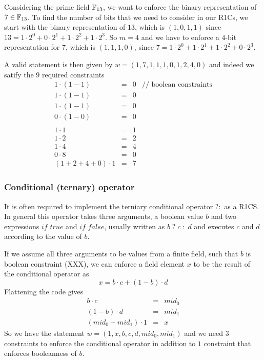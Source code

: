 \begin{example} Considering the prime field $\mathbb{F}_{13}$, we want to enforce the binary representation of $7\in \mathbb{F}_{13}$. To find the number of bits that we need to consider in our R1Cs, we start with the binary representation of $13$, which is $(1,0,1,1)$ since 
$13= 1\cdot 2^0 + 0\cdot 2^1 + 1\cdot 2^2 + 1\cdot 2^3$. So $m=4$ and we have to enforce a $4$-bit representation for $7$, which is $(1,1,1,0)$, since $7= 1\cdot 2^0 + 1\cdot 2^1 + 1\cdot 2^2 + 0\cdot 2^3$.

A valid statement is then given by $w=(1,7,1,1,1,0,1,2,4,0)$ and indeed we satify the $9$ required constraints 
$$
\begin{array}{lclr}
1\cdot (1-1) &=& 0 & \text{// boolean constraints}\\
1\cdot (1-1) &=& 0 &\\
1\cdot (1-1) &=& 0 &\\
0\cdot (1-0) &=& 0  &\\
\\
1 \cdot 1 &=& 1\\
1 \cdot 2 &=& 2\\
1 \cdot 4 &=& 4\\
0 \cdot 8 &=& 0\\
(1 + 2 + 4 + 0)\cdot 1 &=& 7
\end{array}
$$
\end{example}

\subsubsection{Conditional (ternary) operator}
It is often required to implement the terniary conditional operator $?:$ as a R1CS. In general this operator takes three arguments, a boolean value $b$ and two expressions $if\_true$ and $if\_false$, usually written as $b\;?\; c\; :\; d$ and executes $c$ and $d$ according to the value of $b$.

If we assume all three arguments to be values from a finite field, such that $b$ is boolean constraint (XXX), we can enforce a field element $x$ to be the result of the conditional operator as 
$$
x = b\cdot c + (1-b)\cdot d
$$
Flattening the code gives
$$
\begin{array}{lcl}
b \cdot c &=& mid_0\\
(1-b) \cdot d &=& mid_1\\
(mid_0 + mid_1)\cdot 1 &=& x
\end{array}
$$
So we have the statement $w = (1, x, b,c,d, mid_0,mid_1)$ and we need $3$ constraints to enforce the conditional operator in addition to $1$ constraint that enforces booleanness of $b$.


